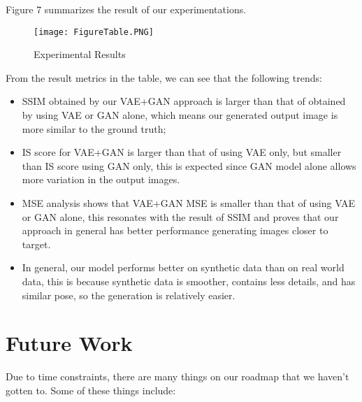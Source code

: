 \documentclass[10pt,conference]{IEEEtran}
\begin{document}
Figure 7 summarizes the result of our experimentations.
\begin{figure*}
  \texttt{[image: FigureTable.PNG]}
  \caption{Experimental Results}
  \label{fig:boat1}
\end{figure*}

From the result metrics in the table, we can see that the following trends: 

\begin{itemize}
\item SSIM obtained by our VAE+GAN approach is larger than that of obtained by using VAE or GAN alone, which means our generated output image is more similar to the ground truth; 
\item IS score for VAE+GAN is larger than that of using VAE only, but smaller than IS score using GAN only, this is expected since GAN model alone allows more variation in the output images. 
\item MSE analysis shows that VAE+GAN MSE is smaller than that of using VAE or GAN alone, this resonates with the result of SSIM and proves that our approach in general has better performance generating images closer to target. 
\item In general, our model performs better on synthetic data than on real world data, this is because synthetic data is smoother, contains less details, and has similar pose, so the generation is relatively easier.
\end{itemize}

\section{Future Work}

Due to time constraints, there are many things on our roadmap that we haven't gotten to. Some of these things include:
\end{document}
